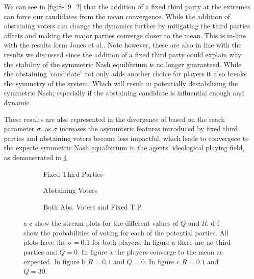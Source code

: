 \documentclass{article}
\begin{document}
        We can see in \cref{fig:8-19_2} that the addition of a fixed third party at the extremes can force our candidates from the mean convergence. While the addition of abstaining voters can change the dynamics further by mitigating the third parties affects and making the major parties converge closer to the mean. This is in-line with the results form Jones et al.. Note however, these are also in line with the results we discussed since the addition of a fixed third party could explain why the stability of the symmetric Nash equilibrium is no longer guaranteed. While the abstaining 'candidate' not only adds another choice for players it also breaks the symmetry of the system. Which will result in potentially destabilizing the symmetric Nash; especially if the abstaining candidate is influential enough and dynamic.

        These results are also represented in the divergence of based on the reach parameter $\sigma$. as $\sigma$ increases the asymmteric features introduced by fixed third parties and abstaining voters become less impactful, which leads to convergece to the expecte symmetric Nash equalbirium in the agents' ideological playing field, as demonstrated in \cref{fig10}

        \begin{figure}[htbp]
          \begin{subfigure}[b]{0.3\linewidth}
                \centering
                 
                \caption{Fixed Third Parties} 
                \label{fig10:a} 
                \vspace{4ex}
            \end{subfigure}%
            \begin{subfigure}[b]{0.3\linewidth}
                \centering
                 
                \caption{Abstaining Voters} 
                \label{fig10:b} 
                \vspace{4ex}
            \end{subfigure} 
            \begin{subfigure}[b]{0.3\linewidth}
                \centering
                 
                \caption{Both Abs. Voters and Fixed T.P.} 
                \label{fig10:c}
                \vspace{4ex}
            \end{subfigure}%
            
        
        \caption{a-c show the stream plots for the different values of $Q$ and $R$. d-f show the probabilities of voting for each of the potential parties. All plots have the $\sigma= 0.1$ for both players. In figure a there are no third parties and $Q=0$. In figure a the players converge to the mean as expected. In figure b $R=0.1$ and $Q=0$. In figure c $R=0.1$ and $Q=30$.}\label{fig10}
        \end{figure}
\end{document}

